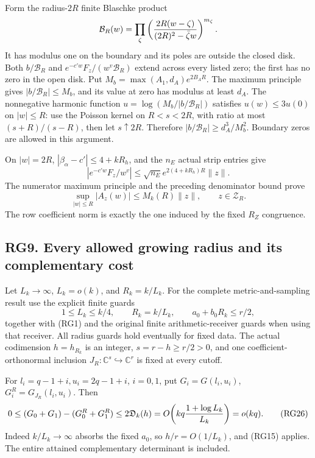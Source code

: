 \documentclass[11pt]{article}
\begin{document}
Form the radius-\(2R\) finite Blaschke product \[
\mathcal B_R(w)=\prod_\zeta
\left({2R(w-\zeta)\over(2R)^2-\bar\zeta w}\right)^{m_\zeta}.
\] It has modulus one on the boundary and its poles are outside the closed disk. Both \(b/\mathcal B_R\) and \(e^{-c'w}F_z/(w^v\mathcal B_R)\) extend across every listed zero; the first has no zero in the open disk. Put \(M_b=\max(A_1,d_A)e^{2B_AR}\). The maximum principle gives \(|b/\mathcal B_R|\le M_b\), and its value at zero has modulus at least \(d_A\). The nonnegative harmonic function \(u=\log(M_b/|b/\mathcal B_R|)\) satisfies \(u(w)\le3u(0)\) on \(|w|\le R\): use the Poisson kernel on \(R<s<2R\), with ratio at most \((s+R)/(s-R)\), then let \(s\uparrow2R\). Therefore \(|b/\mathcal B_R|\ge d_A^3/M_b^2\). Boundary zeros are allowed in this argument.

On \(|w|=2R\), \(|\beta_\alpha-c'|\le4+kR_h\), and the \(n_E\) actual strip entries give \[
|e^{-c'w}F_z/w^v|\le\sqrt{n_E}e^{2(4+kR_h)R}\|z\|.
\] The numerator maximum principle and the preceding denominator bound prove \[
\sup_{|w|\le R}|A_z(w)|\le M_k(R)\|z\|,\qquad z\in\mathcal Z_R.
\tag{RG24}
\] The row coefficient norm is exactly the one induced by the fixed \(R_Z\) congruence.

\subsection{RG9. Every allowed growing radius and its complementary cost}\label{rg9.-every-allowed-growing-radius-and-its-complementary-cost}

Let \(L_k\to\infty\), \(L_k=o(k)\), and \(R_k=k/L_k\). For the complete metric-and-sampling result use the explicit finite guards \[
1\le L_k\le k/4,\qquad R_k=k/L_k,\qquad a_0+b_0R_k\le r/2,
\tag{RG25}
\] together with (RG1) and the original finite arithmetic-receiver guards when using that receiver. All radius guards hold eventually for fixed data. The actual codimension \(h=h_{R_k}\) is an integer, \(s=r-h\ge r/2>0\), and one coefficient-orthonormal inclusion \(J_R:\mathbb C^s\hookrightarrow\mathbb C^r\) is fixed at every cutoff.

For \(l_i=q-1+i,u_i=2q-1+i\), \(i=0,1\), put \(G_i=G(l_i,u_i)\), \(G_i^R=G_{J_R}(l_i,u_i)\). Then \[
0\le(G_0+G_1)-(G_0^R+G_1^R)
\le2\mathfrak D_k(h)
=O\!\left(kq{1+\log L_k\over L_k}\right)=o(kq).
\tag{RG26}
\] Indeed \(k/L_k\to\infty\) absorbs the fixed \(a_0\), so \(h/r=O(1/L_k)\), and (RG15) applies. The entire attained complementary determinant is included.
\end{document}
